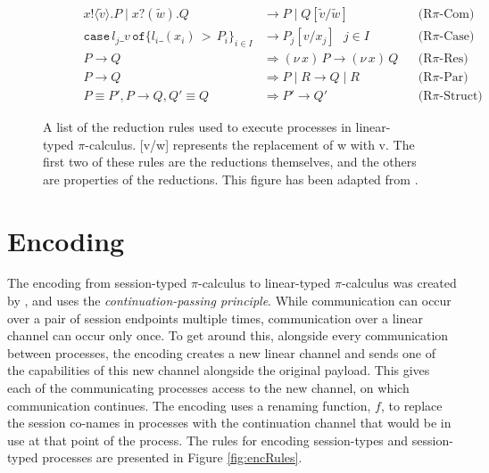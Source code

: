 \documentclass{l4proj}
\begin{document}
\begin{figure}[H]
\centering
\begin{subfigure}{\textwidth}
\begin{align*}
x\texttt{!} \langle \tilde{v} \rangle .P \mid x\texttt{?}(\tilde{w}).Q &\rightarrow P \mid Q[\tilde{v}/\tilde{w}] & &\text{(R}\pi\text{-Com)}\\
\texttt{case}\,l_{j}\_v\,\texttt{of}\{l_{i}\_(x_{i})\,>\,P_{i}\}_{i \in I} &\rightarrow P_{j}[v/x_{j}] \:\:\: j \in I & &\text{(R}\pi\text{-Case)}\\
P \rightarrow Q &\Longrightarrow (\nu\,x)\,P \rightarrow (\nu\,x)\,Q & &\text{(R}\pi\text{-Res)}\\
P \rightarrow Q &\Longrightarrow P \mid R \rightarrow Q \mid R & &\text{(R}\pi\text{-Par)}\\
P \equiv P', P \rightarrow Q, Q' \equiv Q &\Longrightarrow P' \rightarrow Q' & &\text{(R}\pi\text{-Struct)}
\end{align*}
\end{subfigure}
\caption{A list of the reduction rules used to execute processes in linear-typed $\pi$-calculus. [v/w] represents the replacement of w with v. The first two of these rules are the reductions themselves, and the others are properties of the reductions. This figure has been adapted from \citet{DARDHA2017253}.}
\label{fig:linProcReduc}
\end{figure}

\section{Encoding}
\label{bgEncode}

\quad The encoding from session-typed $\pi$-calculus to linear-typed $\pi$-calculus was created by \citet{Dardha:2012:STR:2370776.2370794, DARDHA2017253}, and uses the \emph{continuation-passing principle}. While communication can occur over a pair of session endpoints multiple times, communication over a linear channel can occur only once. To get around this, alongside every communication between processes, the encoding creates a new linear channel and sends one of the capabilities of this new channel alongside the original payload. This gives each of the communicating processes access to the new channel, on which communication continues. The encoding uses a renaming function, $f$, to replace the session co-names in processes with the continuation channel that would be in use at that point of the process. The rules for encoding session-types and session-typed processes are presented in Figure \ref{fig:encRules}.
\end{document}
